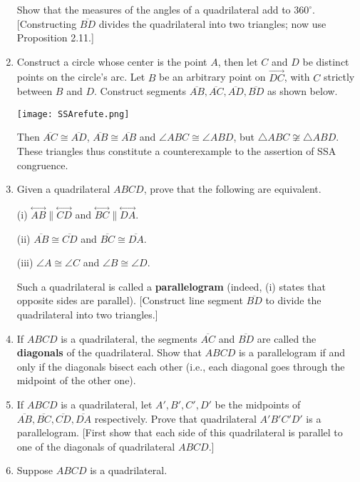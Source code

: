 \documentclass[leqno]{book}
\begin{document}
\begin{enumerate}
Show that the measures of the angles of a quadrilateral add to $360^\circ$.  [Constructing $\overline{BD}$ divides the quadrilateral into two triangles; now use Proposition 2.11.]

\item Construct a circle whose center is the point $A$, then let $C$ and $D$ be distinct points on the circle's arc.  Let $B$ be an arbitrary point on $\overset{\longrightarrow}{DC}$, with $C$ strictly between $B$ and $D$.  Construct segments $\overline{AB},\overline{AC},\overline{AD},\overline{BD}$ as shown below.
\begin{center}\texttt{[image: SSArefute.png]}\end{center}
Then $\overline{AC}\cong\overline{AD}$, $\overline{AB}\cong\overline{AB}$ and $\angle ABC\cong\angle ABD$, but $\triangle ABC\not\cong\triangle ABD$.  These triangles thus constitute a counterexample to the assertion of SSA congruence.

\item Given a quadrilateral $ABCD$, prove that the following are equivalent.

(i) $\overset{\longleftrightarrow}{AB}\parallel\overset{\longleftrightarrow}{CD}$ and $\overset{\longleftrightarrow}{BC}\parallel\overset{\longleftrightarrow}{DA}$.

(ii) $\overline{AB}\cong\overline{CD}$ and $\overline{BC}\cong\overline{DA}$.

(iii) $\angle A\cong\angle C$ and $\angle B\cong\angle D$.

Such a quadrilateral is called a \textbf{parallelogram} (indeed, (i) states that opposite sides are parallel).  [Construct line segment $\overline{BD}$ to divide the quadrilateral into two triangles.]

\item If $ABCD$ is a quadrilateral, the segments $\overline{AC}$ and $\overline{BD}$ are called the \textbf{diagonals} of the quadrilateral.  Show that $ABCD$ is a parallelogram if and only if the diagonals bisect each other (i.e., each diagonal goes through the midpoint of the other one).

\item If $ABCD$ is a quadrilateral, let $A',B',C',D'$ be the midpoints of $\overline{AB},\overline{BC},\overline{CD},\overline{DA}$ respectively.  Prove that quadrilateral $A'B'C'D'$ is a parallelogram.  [First show that each side of this quadrilateral is parallel to one of the diagonals of quadrilateral $ABCD$.]

\item Suppose $ABCD$ is a quadrilateral.


\end{enumerate}
\end{document}
